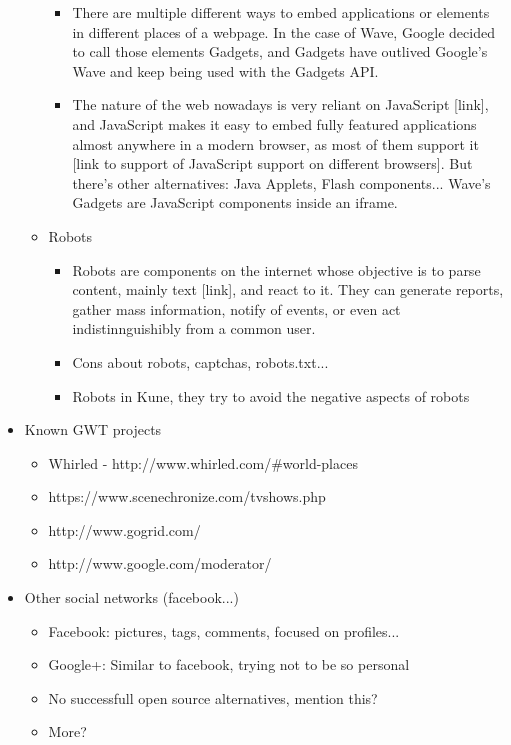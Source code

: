 \begin{itemize}
\begin{itemize}
\begin{itemize}
        \item There are multiple different ways to embed applications or elements in different places of a webpage. In the case of Wave, Google decided to call those elements Gadgets, and Gadgets have outlived Google's Wave and keep being used with the Gadgets API.
        \item The nature of the web nowadays is very reliant on JavaScript [link], and JavaScript makes it easy to embed fully featured applications almost anywhere in a modern browser, as most of them support it [link to support of JavaScript support on different browsers]. But there's other alternatives: Java Applets, Flash components... Wave's Gadgets are JavaScript components inside an iframe.
      \end{itemize}
      \item Robots
      \begin{itemize}
        \item Robots are components on the internet whose objective is to parse content, mainly text [link], and react to it. They can generate reports, gather mass information, notify of events, or even act indistinnguishibly from a common user.
        \item Cons about robots, captchas, robots.txt...
        \item Robots in Kune, they try to avoid the negative aspects of robots
      \end{itemize}
    \end{itemize}
  \item Known GWT projects
  \begin{itemize}
    \item Whirled - http://www.whirled.com/\#world-places
    \item https://www.scenechronize.com/tvshows.php
    \item http://www.gogrid.com/
    \item http://www.google.com/moderator/
  \end{itemize}
  \item Other social networks (facebook...)
  \begin{itemize}
    \item Facebook: pictures, tags, comments, focused on profiles...
    \item Google+: Similar to facebook, trying not to be so personal
    \item No successfull open source alternatives, mention this?
    \item More?
  \end{itemize}

\end{itemize}
